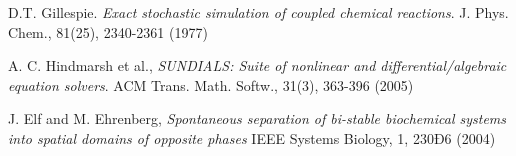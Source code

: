 \documentclass[12pt,notitlepage,nofootinbib]{revtex4}
\begin{document}
\begin{thebibliography}{9}
  
  D.T. Gillespie.
  \textit{Exact stochastic simulation of coupled chemical reactions}.
  J. Phys. Chem., 81(25), 2340-2361 (1977)

  A. C. Hindmarsh et al.,
  \textit{SUNDIALS: Suite of nonlinear and differential/algebraic equation solvers}.
  ACM Trans. Math. Softw., 31(3), 363-396 (2005)
  
  J. Elf and M. Ehrenberg,
  \textit{Spontaneous separation of bi-stable biochemical systems into spatial domains of opposite phases} IEEE Systems Biology, 1, 230Ð6 (2004)
  
\end{thebibliography}
\end{document}
